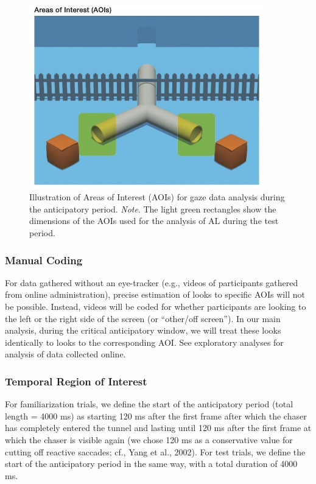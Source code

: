 \documentclass[
  english,
  man,floatsintext]{apa6}
\begin{document}
\begin{figure}

{\centering \includegraphics[width=4in]{Figure4} 

}

\caption{Illustration of Areas of Interest (AOIs) for gaze data analysis during the anticipatory period. \newline{} \textit{Note}. The light green rectangles show the dimensions of the AOIs used for the analysis of AL during the test period.}\label{fig:fig4}
\end{figure}

\hypertarget{manual-coding}{%
\subsubsection{Manual Coding}\label{manual-coding}}

For data gathered without an eye-tracker (e.g., videos of participants gathered from online administration), precise estimation of looks to specific AOIs will not be possible. Instead, videos will be coded for whether participants are looking to the left or the right side of the screen (or ``other/off screen''). In our main analysis, during the critical anticipatory window, we will treat these looks identically to looks to the corresponding AOI. See exploratory analyses for analysis of data collected online.

\hypertarget{temporal-region-of-interest}{%
\subsubsection{Temporal Region of Interest}\label{temporal-region-of-interest}}

For familiarization trials, we define the start of the anticipatory period (total length = 4000 ms) as starting 120 ms after the first frame after which the chaser has completely entered the tunnel and lasting until 120 ms after the first frame at which the chaser is visible again (we chose 120 ms as a conservative value for cutting off reactive saccades; cf., Yang et al., 2002). For test trials, we define the start of the anticipatory period in the same way, with a total duration of 4000 ms.
\end{document}
